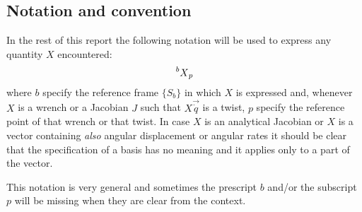 \subsection{Notation and convention}
In the rest of this report the following notation will be used to express any quantity $X$ encountered:
\[
\prescript{b}{}{X}_p
\]
where $b$ specify the reference frame $\{S_b\}$ in which $X$ is expressed and, whenever
$X$ is a wrench or a Jacobian $J$ such that $X\vec{\dot{q}}$ is a twist, $p$ specify the
reference point of that wrench or that twist. In case $X$ is an analytical Jacobian or $X$ is a vector
containing \emph{also} angular displacement or angular rates it should be clear that the specification
of a basis has no meaning and it applies only to a part of the vector.
\par
This notation is very general and sometimes the prescript $b$ and/or the subscript $p$ will
be missing when they are clear from the context.

\newpage

